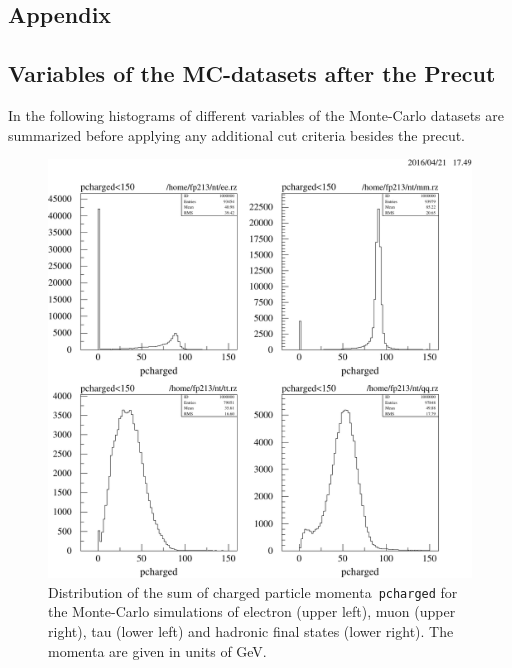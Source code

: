 \documentclass[11pt, a4paper]{article}
\numberwithin{equation}{section}
\begin{document}
\begin{appendix}
\newpage
\section{Appendix}

\subsection{Variables of the MC-datasets after the Precut}
\label{app:uncut_mc}
In the following histograms of different variables of the Monte-Carlo datasets are summarized before applying any additional cut criteria besides the precut.

\begin{figure}[h]
	\centering
	\includegraphics[width=1\textwidth]{./data/tag2/uncut/cropped/pcharged_uncut.pdf}
	\caption{Distribution of the sum of charged particle momenta~\texttt{pcharged} for the Monte-Carlo simulations of electron (upper left), muon (upper right), tau (lower left) and hadronic final states (lower right). The momenta are given in units of GeV.}
\end{figure}


\end{appendix}
\end{document}
